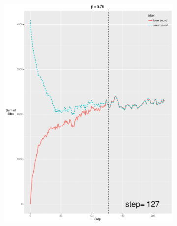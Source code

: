 \documentclass[12pt, oneside]{article}   	%
\begin{document}
\begin{figure}[H]
\begin{subfigure}[b]{0.475\textwidth}
            \includegraphics[width=\textwidth, height=0.5\textheight]{075.pdf}
        \end{subfigure}
        \quad
        \begin{subfigure}[b]{0.475\textwidth}
            \centering

\end{subfigure}
\end{figure}
\end{document}
